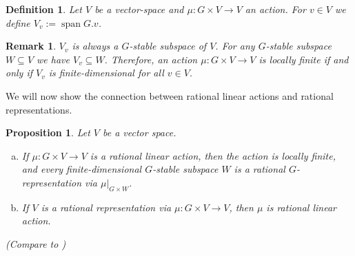 \message{ !name(roughdraft.tex)}\documentclass[a4paper]{article}
\theoremstyle{prrt}
\newtheorem{definition}[theorem]{Definition}
\newtheorem{proposition}[theorem]{Proposition}
\newtheorem{remark}{Remark}[theorem]
\begin{document}
\begin{definition}
  Let $V$ be a vector-space and $\mu \colon G \times V \rightarrow V$ an action.
  For $v \in V$ we define $V_v := \operatorname{span} G.v$.
\end{definition}

\begin{remark}
  $V_v$ is always a $G$-stable subspace of $V$.
  For any $G$-stable subspace $W \subseteq V$ we have $V_v \subseteq W$.
  Therefore, an action $\mu \colon G \times V \rightarrow V$ is locally finite if and only if $V_v$ is finite-dimensional for all $v \in V$.
\end{remark}

We will now show the connection between rational linear actions and rational representations.

\begin{proposition}\label{locfin}
  Let $V$ be a vector space.
  \begin{enumerate}[(a)]
  \item If $\mu \colon G \times V \rightarrow V$ is a rational linear action, then the action is locally finite, and every
    finite-dimensional $G$-stable subspace $W$ is a rational $G$-representation via $\left. \mu \right|_{G\times W}$.
  \item If $V$ is a rational representation via $\mu \colon G \times V \rightarrow V$, then $\mu$ is rational linear action.
  \end{enumerate}

  (Compare to \cite[A.1.8, 2.2.5]{DK15})
\end{proposition}
\end{document}
